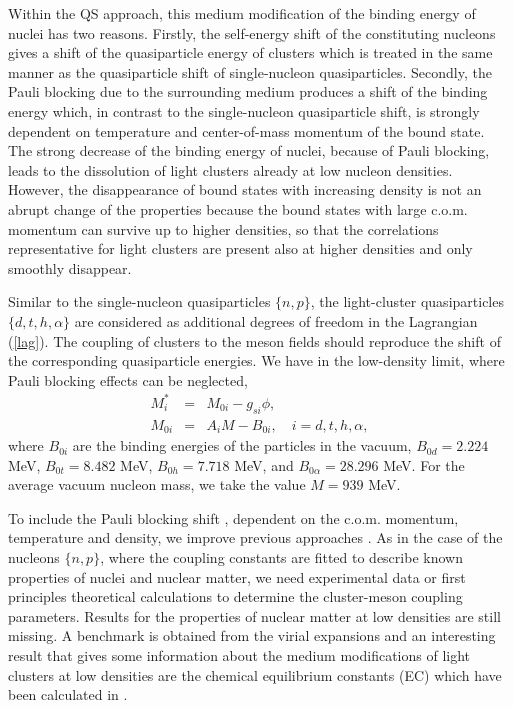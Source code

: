 \documentclass[aps,prc,nofootinbib,twocolumn,showpacs]{revtex4-1}
\begin{document}
Within the QS approach,  this medium modification of the binding energy of nuclei has two reasons. Firstly, the self-energy shift of the constituting nucleons gives a shift of the quasiparticle energy of clusters which is treated in the same manner as the 
quasiparticle shift of single-nucleon quasiparticles. Secondly, the Pauli blocking due to the surrounding medium produces 
a shift of the binding energy which, in contrast to the single-nucleon quasiparticle shift, is strongly dependent on
temperature and center-of-mass momentum of the bound state. The strong decrease of the binding energy of nuclei,
because of Pauli blocking, leads to the dissolution of light clusters already at low nucleon densities. However, the disappearance of bound states with increasing density is not an abrupt change of the properties because the bound states with large c.o.m. momentum can survive up to higher densities,  so that the correlations representative for light clusters are present also at higher densities and only smoothly disappear.
 
Similar to the single-nucleon quasiparticles $\{n,p\}$, the
light-cluster quasiparticles $\{d,t,h,\alpha\}$ are considered as
additional degrees of freedom in the Lagrangian (\ref{lag}). The
coupling of clusters to the meson fields should reproduce the shift of the corresponding quasiparticle energies.
We have in the low-density limit, where Pauli blocking effects can be neglected,
\begin{eqnarray}
M^{*}_i &=&M_{0i} -g_{si}\phi,  \\
M_{0i} &=&A_iM - B_{0i}, \quad i=d,t,h,\alpha,
\label{Mstar1}
\end{eqnarray}
where $B_{0i}$ are the binding energies of the particles in the vacuum,
$B_{0d}=2.224$ MeV, $B_{0t}=8.482$ MeV, $B_{0h}=7.718$ MeV, and
$B_{0\alpha}=28.296$ MeV.  For the average vacuum nucleon mass, we take the value $M = 939$ MeV. 
 
To include the Pauli blocking shift
\cite{roepke11,typel10}, dependent on the c.o.m. momentum, temperature and density, 
we improve previous approaches \cite{ferreira12,PCP15}. 
As in the case of the nucleons $\{n,p\}$, where the coupling constants are fitted to describe known 
properties of nuclei and nuclear matter, we need experimental data or
first principles theoretical calculations  to determine the cluster-meson coupling parameters.
Results for the  properties of nuclear matter at low densities are
still missing. A benchmark is obtained from the virial expansions
\cite{SRS,HS} and an interesting result that gives some information
about  the medium modifications of light clusters at low densities 
are the chemical equilibrium constants (EC)  which  have been
calculated in \cite{qin12}.
\end{document}
